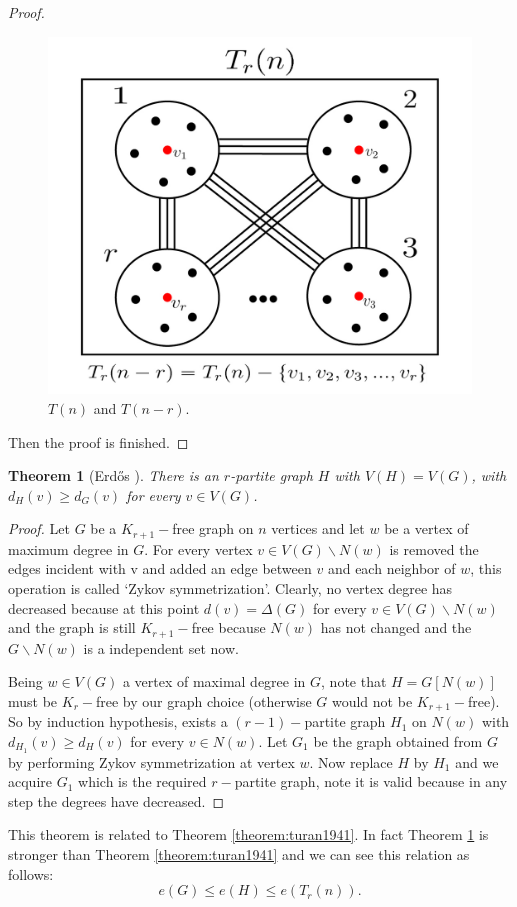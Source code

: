 \documentclass[12pt,twoside,a4paper]{book}
\numberwithin{equation}{section}
\let\setminus=\smallsetminus
\newtheorem{theorem}             {Theorem}[section]
\theoremstyle{remark}
\begin{document}
\begin{proof}
 \begin{figure}[H]
     \centering
     \includegraphics[scale=1]{Figuras/t(n)-and-t(n-r)}
     \caption{$T(n)$ and $T(n-r)$.}
     \label{fig:t(n)-and-t(n-r)}
\end{figure}
Then the proof is finished.
\end{proof}

\begin{theorem}[{Erd\H{o}s \cite{Er70}}]\label{theorem:erdos1970} There is an $ r$-partite graph $H$ with $V(H) = V(G)$, with $d_H(v) \geq d_G(v)$ for every $v \in V(G)$.\\
\end{theorem}

\begin{proof}
 Let $G$ be a $ K_{r+1}-$free graph on $n$ vertices and let $w$ be a vertex of maximum degree in $G$. For every vertex $v \in V(G)\setminus N(w)$ is removed the edges incident with v and added an edge between $v$ and each neighbor of $w$, this operation is called `Zykov symmetrization'. Clearly, no vertex degree has decreased because at this point $d(v) = \Delta(G)$ for every $v \in V(G)\setminus N(w)$ and the graph is still $K_{r+1}-$free because $N(w)$ has not changed and the $G\setminus N(w)$ is a independent set now.

Being $w\in V(G)$ a vertex of maximal degree in $G$, note that $H=G[N(w)]$ must be $K_r-$free by our graph choice (otherwise $G$ would not be $K_{r+1}-$free). So by induction hypothesis, exists a $(r-1)-$partite graph $H_1$ on $N(w)$ with $d_{H_1}(v) \geq d_{H}(v)$ for every $v \in N(w)$. Let $G_1$ be the graph obtained from $G$ by performing Zykov symmetrization at vertex $w$. Now replace $H$ by $H_1$ and we acquire $G_1$ which is the required $r-$partite graph, note it is valid because in any step the degrees have decreased.
\end{proof}
This theorem is related to Theorem \ref{theorem:turan1941}. In fact Theorem \ref{theorem:erdos1970} is stronger than Theorem \ref{theorem:turan1941} and we can see this relation as follows: $$e(G) \leq e(H) \leq e(T_r(n)).$$
\end{document}
